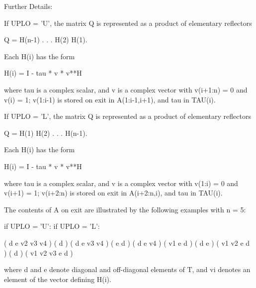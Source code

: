 \begin{DoxyParagraph}{Further Details\+: }
\begin{DoxyVerb}  If UPLO = 'U', the matrix Q is represented as a product of elementary
  reflectors

     Q = H(n-1) . . . H(2) H(1).

  Each H(i) has the form

     H(i) = I - tau * v * v**H

  where tau is a complex scalar, and v is a complex vector with
  v(i+1:n) = 0 and v(i) = 1; v(1:i-1) is stored on exit in
  A(1:i-1,i+1), and tau in TAU(i).

  If UPLO = 'L', the matrix Q is represented as a product of elementary
  reflectors

     Q = H(1) H(2) . . . H(n-1).

  Each H(i) has the form

     H(i) = I - tau * v * v**H

  where tau is a complex scalar, and v is a complex vector with
  v(1:i) = 0 and v(i+1) = 1; v(i+2:n) is stored on exit in A(i+2:n,i),
  and tau in TAU(i).

  The contents of A on exit are illustrated by the following examples
  with n = 5:

  if UPLO = 'U':                       if UPLO = 'L':

    (  d   e   v2  v3  v4 )              (  d                  )
    (      d   e   v3  v4 )              (  e   d              )
    (          d   e   v4 )              (  v1  e   d          )
    (              d   e  )              (  v1  v2  e   d      )
    (                  d  )              (  v1  v2  v3  e   d  )

  where d and e denote diagonal and off-diagonal elements of T, and vi
  denotes an element of the vector defining H(i).\end{DoxyVerb}
 
\end{DoxyParagraph}
